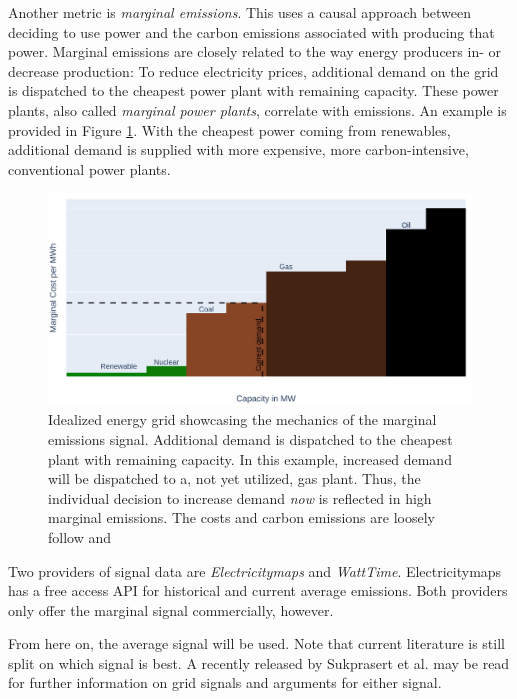 Another metric is \emph{marginal emissions}. 
This uses a causal approach between deciding to use power and the carbon emissions associated with producing that power.
Marginal emissions are closely related to the way energy producers in- or decrease production:
To reduce electricity prices, additional demand on the grid is dispatched to the cheapest power plant with remaining capacity.
These power plants, also called \emph{marginal power plants}, correlate with emissions. 
An example is provided in Figure \ref{fig:marginal_example}. 
With the cheapest power coming from renewables, additional demand is supplied with more expensive, more carbon-intensive, conventional power plants.

\begin{figure}
    \includegraphics[width=\linewidth]{notebooks/marginal_emissions.pdf}
    \caption[short]{
        Idealized energy grid showcasing the mechanics of the marginal emissions signal. 
        Additional demand is dispatched to the cheapest plant with remaining capacity. 
        In this example, increased demand will be dispatched to a, not yet utilized, gas plant.
        Thus, the individual decision to increase demand \emph{now} is reflected in high marginal emissions.
        The costs and carbon emissions are loosely follow  and  
        }
    \label{fig:marginal_example}
\end{figure}

Two providers of signal data are \emph{Electricitymaps} and \emph{WattTime}.
Electricitymaps has a free access API for historical and current average emissions. Both providers only offer the marginal signal commercially, however. 

From here on, the average signal will be used. 
Note that current literature is still split on which signal is best. 
A recently released by Sukprasert et al. \cite{sukprasert_limitations_2024} may be read for further information on grid signals and arguments for either signal.

